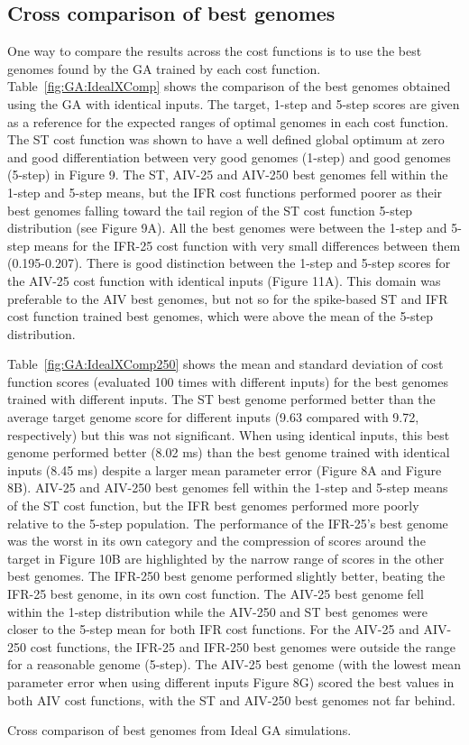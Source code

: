 \subsection{Cross comparison of best genomes}\label{sec:GA:Ideal-Xcomp-best}



One way to compare the results across the cost functions is to use the
best genomes found by the GA trained by each cost function. Table~\ref{fig:GA:IdealXComp}
shows the comparison of the best genomes obtained using the GA with
identical inputs.  The target, 1-step and 5-step scores are given as a
reference for the expected ranges of optimal genomes in each cost
function.  The ST cost function was shown to have a well defined
global optimum at zero and good differentiation between very good
genomes (1-step) and good genomes (5-step) in Figure 9.  The ST,
AIV-25 and AIV-250 best genomes fell within the 1-step and 5-step
means, but the IFR cost functions performed poorer as their best
genomes falling toward the tail region of the ST cost function 5-step
distribution (see Figure 9A).  All the best genomes were between the
1-step and 5-step means for the IFR-25 cost function with very small
differences between them (0.195-0.207).  There is good distinction
between the 1-step and 5-step scores for the AIV-25 cost function with
identical inputs (Figure 11A).  This domain was preferable to the AIV
best genomes, but not so for the spike-based ST and IFR cost function
trained best genomes, which were above the mean of the 5-step
distribution.

Table~\ref{fig:GA:IdealXComp250} shows the mean and standard deviation of cost function scores
(evaluated 100 times with different inputs) for the best genomes
trained with different inputs. The ST best genome performed better
than the average target genome score for different inputs (9.63
compared with 9.72, respectively) but this was not significant. When
using identical inputs, this best genome performed better (8.02 ms)
than the best genome trained with identical inputs (8.45 ms) despite a
larger mean parameter error (Figure 8A and Figure 8B).  AIV-25 and
AIV-250 best genomes fell within the 1-step and 5-step means of the ST
cost function, but the IFR best genomes performed more poorly relative
to the 5-step population.  The performance of the IFR-25's best genome
was the worst in its own category and the compression of scores around
the target in Figure 10B are highlighted by the narrow range of scores
in the other best genomes. The IFR-250 best genome performed slightly
better, beating the IFR-25 best genome, in its own cost function. The
AIV-25 best genome fell within the 1-step distribution while the
AIV-250 and ST best genomes were closer to the 5-step mean for both
IFR cost functions. For the AIV-25 and AIV-250 cost functions, the
IFR-25 and IFR-250 best genomes were outside the range for a
reasonable genome (5-step).  The AIV-25 best genome (with the lowest
mean parameter error when using different inputs Figure 8G) scored the
best values in both AIV cost functions, with the ST and AIV-250 best
genomes not far behind.


\begin{table}[tbh]
  \centering
%  
  \caption{Cross comparison of best genomes from Ideal GA simulations.}
  \label{tab:GA:IdealXComp}
\end{table}



